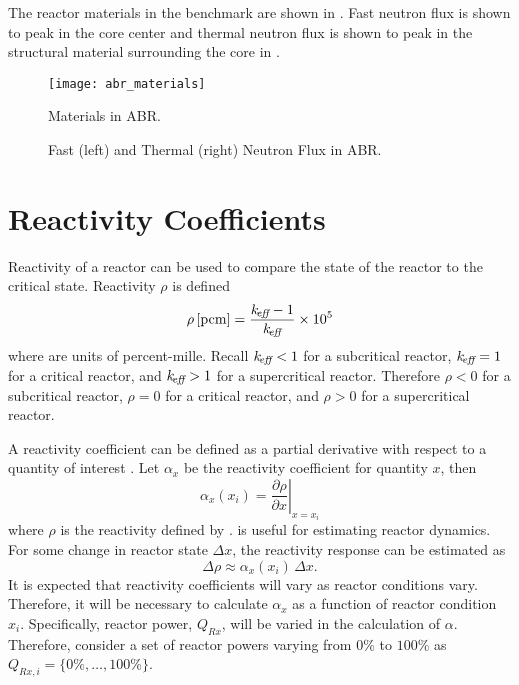   The reactor materials in the benchmark are shown in . 
  Fast neutron flux is shown to peak in the core center and thermal neutron flux 
  is shown to peak in the structural material surrounding the core in
  .

  \begin{figure}
    \centering
    \texttt{[image: abr\_materials]}
    \caption{Materials in ABR.}
    \label{fig:abr_materials}
  \end{figure}

  \begin{figure}
    \centering
    \hspace{0.2in}
    \caption{Fast (left) and Thermal (right) Neutron Flux in ABR.}
    \label{fig:abr_fluxes}
  \end{figure}

\section{Reactivity Coefficients}
\label{sec:reactivity_coefficients}
  Reactivity of a reactor can be used to compare the state of the reactor to the
  critical state. Reactivity $\rho$ is defined
  \begin{equation}
    \label{eq:reactivity}
    \rho \left[\text{{pcm}}\right] = \frac{k_{\!\mbox{\scriptsize \em eff}}-1}{k_{\!\mbox{\scriptsize \em eff}}} \times 10^5
  \end{equation}
  where  are units of percent-mille.
  Recall $k_{\!\mbox{\scriptsize \em eff}} < 1$ for a subcritical reactor, $k_{\!\mbox{\scriptsize \em eff}}=1$ for a critical
  reactor, and $k_{\!\mbox{\scriptsize \em eff}} > 1$ for a supercritical reactor. Therefore $\rho < 0$
  for a subcritical reactor, $\rho = 0$ for a critical reactor, and $\rho > 0$
  for a supercritical reactor. 

  A reactivity coefficient can be defined as a partial derivative with respect
  to a quantity of interest \cite{textbookknief}. Let $\alpha_x$ be the 
  reactivity coefficient for quantity $x$, then
  \begin{equation}
    \label{eq:reactivity_coefficient}
    \alpha_x(x_i) = \left. \frac{\partial \rho}{\partial x} \right|_{x=x_i}
  \end{equation}
  where $\rho$ is the reactivity defined by .
   is useful for estimating reactor dynamics.
  For some change in reactor state $\Delta x$, the reactivity response can be
  estimated as 
  \begin{equation}
    \label{eq:reactivity_estimate}
    \Delta \rho \approx \alpha_x(x_i) \, \Delta x.
  \end{equation}
  It is expected that reactivity coefficients will vary as reactor conditions
  vary. Therefore, it will be necessary to calculate $\alpha_x$ as a function of
  reactor condition $x_i$. Specifically, reactor power, $Q_{Rx}$, will be varied 
  in the calculation of $\alpha$. Therefore, consider a set of reactor powers
  varying from $0\%$ to $100\%$ as $Q_{Rx,i} = \{0\%,\ldots,100\%\}$.

